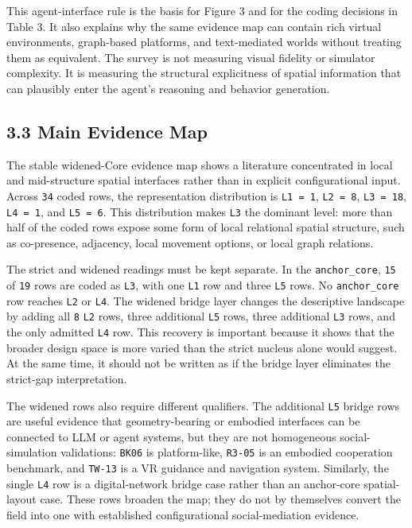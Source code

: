\documentclass[
  twocolumn]{article}
\begin{document}
This agent-interface rule is the basis for Figure 3 and for the coding
decisions in Table 3. It also explains why the same evidence map can
contain rich virtual environments, graph-based platforms, and
text-mediated worlds without treating them as equivalent. The survey is
not measuring visual fidelity or simulator complexity. It is measuring
the structural explicitness of spatial information that can plausibly
enter the agent's reasoning and behavior generation.

\subsection{3.3 Main Evidence Map}\label{main-evidence-map}

The stable widened-Core evidence map shows a literature concentrated in
local and mid-structure spatial interfaces rather than in explicit
configurational input. Across \texttt{34} coded rows, the representation
distribution is \texttt{L1\ =\ 1}, \texttt{L2\ =\ 8},
\texttt{L3\ =\ 18}, \texttt{L4\ =\ 1}, and \texttt{L5\ =\ 6}. This
distribution makes \texttt{L3} the dominant level: more than half of the
coded rows expose some form of local relational spatial structure, such
as co-presence, adjacency, local movement options, or local graph
relations.

The strict and widened readings must be kept separate. In the
\texttt{anchor\_core}, \texttt{15} of \texttt{19} rows are coded as
\texttt{L3}, with one \texttt{L1} row and three \texttt{L5} rows. No
\texttt{anchor\_core} row reaches \texttt{L2} or \texttt{L4}. The
widened bridge layer changes the descriptive landscape by adding all
\texttt{8} \texttt{L2} rows, three additional \texttt{L5} rows, three
additional \texttt{L3} rows, and the only admitted \texttt{L4} row. This
recovery is important because it shows that the broader design space is
more varied than the strict nucleus alone would suggest. At the same
time, it should not be written as if the bridge layer eliminates the
strict-gap interpretation.

The widened rows also require different qualifiers. The additional
\texttt{L5} bridge rows are useful evidence that geometry-bearing or
embodied interfaces can be connected to LLM or agent systems, but they
are not homogeneous social-simulation validations: \texttt{BK06} is
platform-like, \texttt{R3-05} is an embodied cooperation benchmark, and
\texttt{TW-13} is a VR guidance and navigation system. Similarly, the
single \texttt{L4} row is a digital-network bridge case rather than an
anchor-core spatial-layout case. These rows broaden the map; they do not
by themselves convert the field into one with established
configurational social-mediation evidence.
\end{document}
